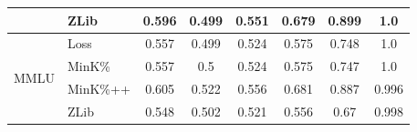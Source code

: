 \documentclass{article} %
\begin{document}
\begin{table}[h]
\begin{tabular}{clcccccc}
                                     & ZLib                                                        &   0.596       &   0.499      &  0.551       &   0.679       &   0.899       &  1.0           \\ \midrule
\multirow{4}{*}{MMLU}                & Loss                                                        &   0.557       &   0.499      &  0.524       &   0.575       &   0.748       &  1.0           \\  
                                     & MinK\%                                                      &   0.557       &   0.5      &  0.524       &   0.575       &   0.747       &  1.0           \\  
                                     & MinK\%++                                                    &   0.605       &   0.522      &  0.556       &   0.681       &   0.887       &  0.996           \\  
                                     & ZLib                                                        &   0.548       &   0.502      &  0.521       &   0.556       &   0.67       &  0.998           \\ \bottomrule
\end{tabular}
\end{table}
\end{document}
